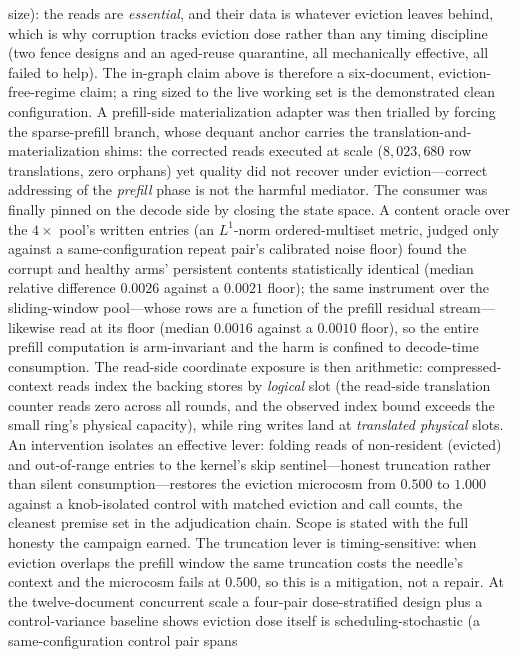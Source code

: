 \documentclass[11pt]{article}
\begin{document}
size): the reads are \emph{essential}, and their data
is whatever eviction leaves behind, which is why corruption tracks
eviction dose rather than any timing discipline (two fence designs and
an aged-reuse quarantine, all mechanically effective, all failed to
help). The in-graph claim above is therefore a six-document,
eviction-free-regime claim; a ring sized to the live working set is the
demonstrated clean configuration. A prefill-side materialization
adapter was then trialled by forcing the sparse-prefill branch, whose
dequant anchor carries the translation-and-materialization shims: the
corrected reads executed at scale ($8{,}023{,}680$ row translations,
zero orphans) yet quality did not recover under eviction---correct
addressing of the \emph{prefill} phase is not the harmful mediator.
The consumer was finally pinned on the decode side by closing the state
space. A content oracle over the $4\times$ pool's written entries (an
$L^1$-norm ordered-multiset metric, judged only against a
same-configuration repeat pair's calibrated noise floor) found the
corrupt and healthy arms' persistent contents statistically identical
(median relative difference $0.0026$ against a $0.0021$ floor); the
same instrument over the sliding-window pool---whose rows are a
function of the prefill residual stream---likewise read at its floor
(median $0.0016$ against a $0.0010$ floor),
so the entire prefill computation is arm-invariant and the harm is
confined to decode-time consumption. The read-side coordinate exposure is
then arithmetic: compressed-context reads index the backing stores by
\emph{logical} slot (the read-side translation counter reads zero
across all rounds, and the observed index bound exceeds the small
ring's physical capacity), while ring writes land at \emph{translated
physical} slots. An intervention isolates an effective lever: folding
reads of non-resident (evicted) and out-of-range entries to the
kernel's skip sentinel---honest truncation rather than silent
consumption---restores the eviction microcosm from $0.500$ to $1.000$
against a knob-isolated control with matched eviction and call counts,
the cleanest premise set in the adjudication chain. Scope is stated
with the full honesty the campaign earned. The truncation lever is
timing-sensitive: when eviction overlaps the prefill window the same
truncation costs the needle's context and the microcosm fails at
$0.500$, so this is a mitigation, not a repair. At the twelve-document
concurrent scale a four-pair dose-stratified design plus a
control-variance baseline shows eviction dose itself is
scheduling-stochastic (a same-configuration control pair spans
\end{document}
